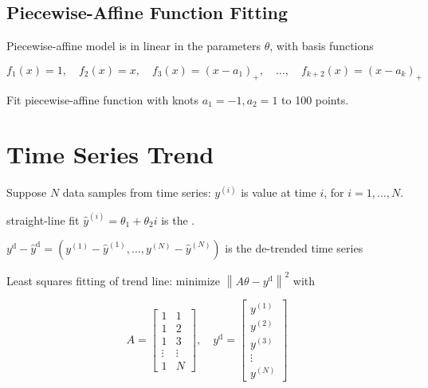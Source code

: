\subsection{Piecewise-Affine Function Fitting}

Piecewise-affine model is in linear in the parameters $ \theta $, with basis functions

\begin{equation}
f_{1}(x)=1, \quad f_{2}(x)=x, \quad f_{3}(x)=\left(x-a_{1}\right)_{+}, \quad \ldots, \quad f_{k+2}(x)=\left(x-a_{k}\right)_{+}
\end{equation}

\begin{example}
    Fit piecewise-affine function with knots $ a_{1}=-1, a_{2}=1 $ to 100 points.
\end{example}

\section{Time Series Trend}

\begin{definition}
    Suppose $ N $ data samples from time series: $ y^{(i)} $ is value at time $ i $, for $ i=1, \ldots, N $.

    straight-line fit $ \hat{y}^{(i)}=\theta_{1}+\theta_{2} i $ is the .
\end{definition}

\begin{definition}
    $ y^{\mathrm{d}}-\hat{y}^{\mathrm{d}}=\left(y^{(1)}-\hat{y}^{(1)}, \ldots, y^{(N)}-\hat{y}^{(N)}\right) $ is the de-trended time series
\end{definition}

\begin{problem}
    Least squares fitting of trend line: minimize $ \left\|A \theta-y^{\mathrm{d}}\right\|^{2} $ with

\begin{equation} A=\left[\begin{array}{cc}1 & 1 \\ 1 & 2 \\ 1 & 3 \\ \vdots & \vdots \\ 1 & N\end{array}\right], \quad y^{\mathrm{d}}=\left[\begin{array}{c}y^{(1)} \\ y^{(2)} \\ y^{(3)} \\ \vdots \\ y^{(N)}\end{array}\right] \end{equation}
\end{problem}


